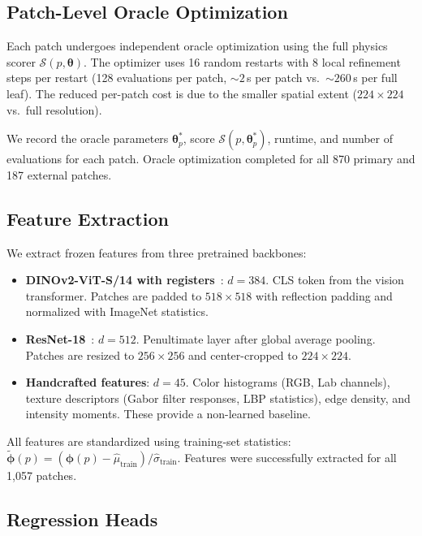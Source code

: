 \documentclass[11pt,a4paper]{article}
\newcommand{\btheta}{\boldsymbol{\theta}}
\newcommand{\bphi}{\boldsymbol{\phi}}
\newcommand{\cS}{\mathcal{S}}
\begin{document}
\subsection{Patch-Level Oracle Optimization}

Each patch undergoes independent oracle optimization using the
full physics scorer $\cS(p, \btheta)$. The optimizer uses
16 random restarts with 8 local refinement steps per restart
(128 evaluations per patch, ${\sim}2$\,s per patch vs.\
${\sim}260$\,s per full leaf). The reduced per-patch cost is due to
the smaller spatial extent ($224{\times}224$ vs.\ full resolution).

We record the oracle parameters $\btheta^*_p$, score $\cS(p, \btheta^*_p)$,
runtime, and number of evaluations for each patch.
Oracle optimization completed for all 870 primary and 187 external patches.

\subsection{Feature Extraction}

We extract frozen features from three pretrained backbones:

\begin{itemize}[leftmargin=*,itemsep=2pt]
\item \textbf{DINOv2-ViT-S/14 with registers}~\cite{oquab2024dinov2,darcet2024vision}:
  $d=384$. CLS token from the vision transformer.
  Patches are padded to $518{\times}518$ with reflection padding
  and normalized with ImageNet statistics.

\item \textbf{ResNet-18}~\cite{he2016deep}: $d=512$. Penultimate layer
  after global average pooling. Patches are resized to $256{\times}256$
  and center-cropped to $224{\times}224$.

\item \textbf{Handcrafted features}: $d=45$. Color histograms (RGB, Lab channels),
  texture descriptors (Gabor filter responses, LBP statistics),
  edge density, and intensity moments. These provide a non-learned baseline.
\end{itemize}

All features are standardized using training-set statistics:
$\tilde{\bphi}(p) = (\bphi(p) - \hat{\mu}_\text{train}) / \hat{\sigma}_\text{train}$.
Features were successfully extracted for all 1{,}057 patches.

\subsection{Regression Heads}
\end{document}
